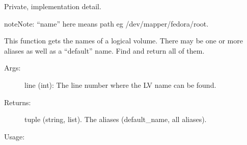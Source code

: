 \documentclass[letterpaper,10pt,english]{sphinxmanual}
\begin{document}

\begin{fulllineitems}
\label{\detokenize{linux:getdevinfo.linux.get_lv_aliases}}
Private, implementation detail.

\begin{sphinxadmonition}{note}{Note:}
“name” here means path eg /dev/mapper/fedora/root.
\end{sphinxadmonition}

This function gets the names of a logical volume.
There may be one or more aliases as well as a “default”
name. Find and return all of them.
\begin{description}
\item[{Args:}] \leavevmode
line (int):   The line number where the LV name can be found.

\item[{Returns:}] \leavevmode
tuple (string, list). The aliases (default\_name, all aliases).

\end{description}

Usage:

\begin{sphinxVerbatim}[commandchars=\\\{\}]
   
\end{sphinxVerbatim}

\end{fulllineitems}

\end{document}
